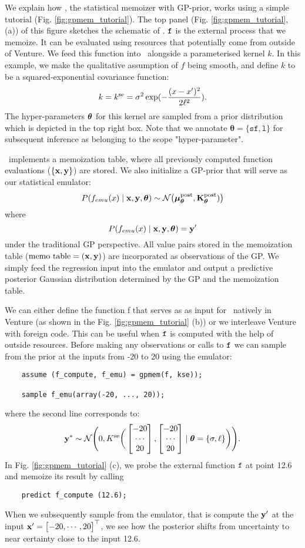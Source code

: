 We explain how \gpmem, the statistical memoizer with \ac{GP}-prior, works using a simple tutorial
(Fig. \ref{fig:gpmem_tutorial}). 
The top panel (Fig. \ref{fig:gpmem_tutorial}, (a)) of this figure sketches the schematic of \gpmem.
$\texttt{f}$ is the external process that we memoize. It can be evaluated using resources that potentially come
from outside of Venture.  
We feed this function into \gpmem\ alongside
a parameterised kernel $k$.  
In this example, we make the qualitative assumption of $f$ being smooth, and define
$k$ to be a squared-exponential covariance function:
\[
k = k^\text{se} = \sigma^2 \exp(-\frac{(x-x^\prime)^2}{2\ell^2}).
\]
The hyper-parameters $\bm{\theta}$ for this kernel are sampled from a 
prior distribution which is depicted in the top right box.
Note that we annotate $\bm{\theta}=\{\texttt{sf},\texttt{l}\}$ for subsequent
inference as belonging to the scope "hyper-parameter".

\gpmem\ implements a memoization table, where all previously
computed function evaluations ($\{\mathbf{x},\mathbf{y}\}$) are stored. We also initialize a \ac{GP}-prior that
will serve as our statistical emulator:
\[
P(f_{emu}(x) \mid \mathbf{x},\mathbf{y},\bm{\theta})\sim
\mathcal{N}\big(\bm{\mu}_{\bm{\theta}}^\text{post},\mathbf{K}_{\bm{\theta}}^\text{post})\big)
\]
where 
\[
P(f_{emu}(x) \mid \mathbf{x},\mathbf{y},\bm{\theta}) = \mathbf{y}^\prime 
\]
under the traditional \ac{GP} perspective.
All value pairs stored in the memoization table ($\text{memo table} = (\mathbf{x},\mathbf{y})$) are incorporated as observations of
the \ac{GP}.
We simply feed the regression input
into the emulator and output a predictive posterior Gaussian distribution determined by the \ac{GP} and
the memoization table.

We can either define the function f that serves as as input for \gpmem\
 natively in Venture
(as shown in the Fig. \ref{fig:gpmem_tutorial} (b)) or we interleave Venture with foreign code. 
This can be useful when $\texttt{f}$ is computed with the help of outside resources.
Before making any observations or calls to $\texttt{f}$
we can sample from the prior at the inputs from -20 to 20 using the emulator:
    \begin{lstlisting}
    assume (f_compute, f_emu) = gpmem(f, kse));

    sample f_emu(array(-20, ..., 20));
    \end{lstlisting}
where the second line corresponds to:
\[ 
\mathbf{y}^* \sim \mathcal{N}\Bigg(0,K^\text{se}\bigg(
\begin{bmatrix} 
-20 \\
\cdots \\
20
 \end{bmatrix},
\begin{bmatrix} 
-20 \\
\cdots \\
20
 \end{bmatrix}
\mid \bm{\theta}=\{\sigma,\ell\}
\bigg)
\Bigg).
\]
In Fig. \ref{fig:gpmem_tutorial} (c), we probe the external function $\texttt{f}$ at point 12.6 and memoize its result by calling 
   \begin{lstlisting}
    predict f_compute (12.6);
    \end{lstlisting}
When we subsequently sample from the emulator, that is compute the $\mathbf{y}^\prime$ at the input
$\mathbf{x}^\prime= \begin{bmatrix} -20, \cdots, 20 \end{bmatrix}^\top$, we see how the posterior shifts from uncertainty to near certainty close to the input 12.6.

